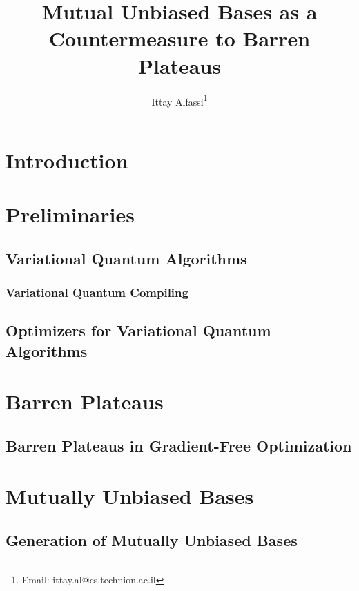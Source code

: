 \documentclass[a4paper,12pt]{article}
\title{Mutual Unbiased Bases as a Countermeasure to Barren Plateaus}
\author{Ittay Alfassi\footnote{Email: ittay.al@cs.technion.ac.il}}
\begin{document}
\maketitle

\thispagestyle{fancy}

\tableofcontents

\section{Introduction}


\section{Preliminaries}

\subsection{Variational Quantum Algorithms}

\subsubsection{Variational Quantum Compiling}

\subsection{Optimizers for Variational Quantum Algorithms}


\section{Barren Plateaus}

\subsection{Barren Plateaus in Gradient-Free Optimization}


\section{Mutually Unbiased Bases}

\subsection{Generation of Mutually Unbiased Bases}
\end{document}
